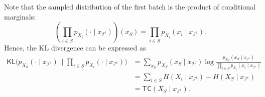 \documentclass[english]{article}
\newcommand{\cI}{\mathcal{I}}
\newcommand{\KL}{\mathsf{KL}}
\newcommand{\TC}{\mathsf{TC}}
\begin{document}
Note that the sampled distribution of the first batch is the product of conditional marginals:
\[
    \left(\prod_{i \in S} p_{X_i}(\cdot \mid x_{\cI^\mathsf{c}})\right)(x_S) = \prod_{i \in S} p_{X_i}(x_i \mid x_{\cI^\mathsf{c}}).
\]
Hence, the KL divergence can be expressed as
\begin{align*}
    \KL\big(p_{X_S}(\cdot \mid x_{\cI^\mathsf{c}}) \| \prod_{i \in S} p_{X_i}(\cdot \mid x_{\cI^\mathsf{c}})\big) &= \sum_{x_S} p_{X_S}(x_S \mid x_{\cI^\mathsf{c}}) \log \frac{p_{X_S}(x_S \mid x_{\cI^\mathsf{c}})}{\prod_{i \in S} p_{X_i}(x_i \mid x_{\cI^\mathsf{c}})} \\
    &= \sum_{i \in S} H(X_i \mid x_{\cI^\mathsf{c}}) - H(X_S \mid x_{\cI^\mathsf{c}}) \\
    &= \TC(X_S \mid x_{\cI^\mathsf{c}}).
\end{align*}
\end{document}
